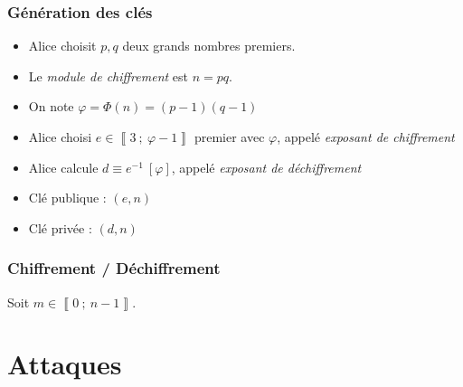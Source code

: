 \documentclass{beamer}
\newcommand{\nset}[2]{\left\llbracket #1\ ;\ #2 \right\rrbracket}
\begin{document}
    \begin{frame}
        \frametitle{Génération des clés}

        \begin{itemize}
            \item<1-> Alice choisit $p, q$ deux grands nombres premiers.

            \item<2-> Le \emph{module de chiffrement} est $n = pq$.

            \item<3-> On note $\varphi = \varPhi(n) = (p - 1)(q - 1)$

            \item<4-> Alice choisi $e \in \nset 3 {\varphi - 1}$ premier avec $\varphi$, appelé \emph{exposant de chiffrement}

            \item<5-> Alice calcule $d \equiv e^{-1}\ [\varphi]$, appelé \emph{exposant de déchiffrement}

            \vspace{12pt}

            \item<6-> Clé publique : $(e, n)$
            \item<6-> Clé privée : $(d, n)$
        \end{itemize}
    \end{frame}

    \begin{frame}
        \frametitle{Chiffrement / Déchiffrement}

        Soit $m \in \nset 0 {n - 1}$.



    \end{frame}

    \section{Attaques}
\end{document}
